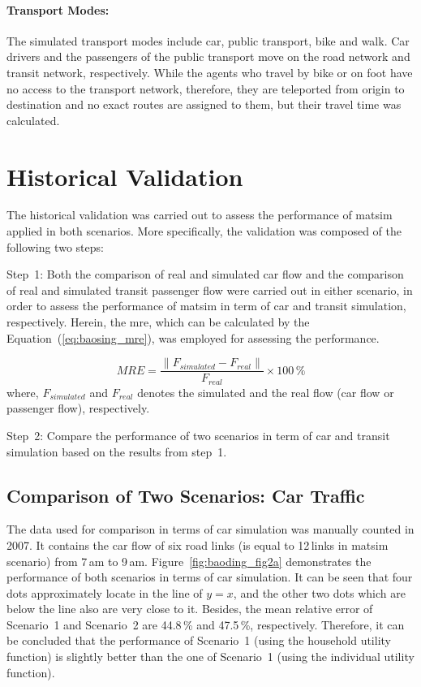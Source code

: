 \paragraph{Transport Modes:} The simulated transport modes include car, public transport, bike and walk. Car drivers and the passengers of the public transport move on the road network and transit network, respectively. While the agents who travel by bike or on foot have no access to the transport network, therefore, they are teleported from origin to destination and no exact routes are assigned to them, but their travel time was calculated. 

\section{Historical Validation}
The historical validation was carried out to assess the performance of \gls{matsim} applied in both scenarios. 
More specifically, the validation was composed of the following two steps:

Step~1: Both the comparison of real and simulated car flow and the comparison of real and simulated transit passenger flow were carried out in either scenario, in order to assess the performance of \gls{matsim} in term of car and transit simulation, respectively. 
Herein, the \gls{mre}, which can be calculated by the Equation~(\ref{eq:baosing_mre}), was employed for assessing the performance.

\begin{equation}
\label{eq:baoding_mre}
MRE = \frac{\lVert F_{simulated} - F_{real} \lVert}{F_{real}} \times 100\,\%
\end{equation} 
where, $F_{simulated}$ and $F_{real}$ denotes the simulated and the real flow (car flow or passenger flow), respectively.

Step~2: Compare the performance of two scenarios in term of car and transit simulation based on the results from step~1. 

\subsection{Comparison of Two Scenarios: Car Traffic}
The data used for comparison in terms of car simulation was manually counted in 2007. 
It contains the car flow of six road links (is equal to 12\,links in \gls{matsim} scenario) from 7\,am to 9\,am. 
Figure~\ref{fig:baoding_fig2a} demonstrates the performance of both scenarios in terms of car simulation. 
It can be seen that four dots approximately locate in the line of $y=x$, and the other two dots which are below the line also are very close to it. 
Besides, the mean relative error of Scenario~1 and Scenario~2 are 44.8\,\% and 47.5\,\%, respectively. 
Therefore, it can be concluded that the performance of Scenario~1 (using the household utility function) is slightly better than the one of Scenario~1 (using the individual utility function). 

